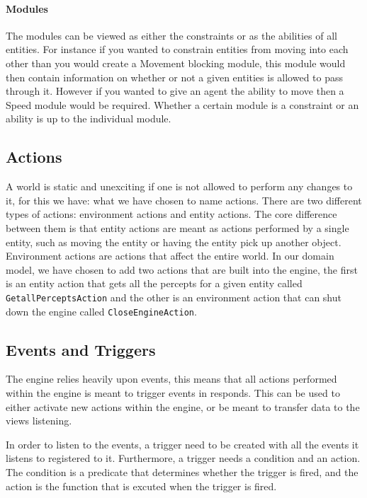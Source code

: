 \paragraph*{Modules}

The modules can be viewed as either the constraints or as the abilities
of all entities. For instance if you wanted to constrain entities
from moving into each other than you would create a Movement blocking
module, this module would then contain information on whether or not
a given entities is allowed to pass through it. However if you wanted
to give an agent the ability to move then a Speed module would be
required. Whether a certain module is a constraint or an ability is
up to the individual module.


\subsection{Actions}

A world is static and unexciting if one is not allowed to perform
any changes to it, for this we have: what we have chosen to name actions.
There are two different types of actions: environment actions and
entity actions. The core difference between them is that entity actions
are meant as actions performed by a single entity, such as moving
the entity or having the entity pick up another object. Environment
actions are actions that affect the entire world. In our domain model,
we have chosen to add two actions that are built into the engine,
the first is an entity action that gets all the percepts for a given
entity called \texttt{GetallPerceptsAction} and the other is an environment
action that can shut down the engine called \texttt{CloseEngineAction}. 


\subsection{Events and Triggers}

The engine relies heavily upon events, this means that all actions
performed within the engine is meant to trigger events in responds.
This can be used to either activate new actions within the engine,
or be meant to transfer data to the views listening. 

In order to listen to the events, a trigger need to be created with
all the events it listens to registered to it. Furthermore, a trigger
needs a condition and an action. The condition is a predicate that
determines whether the trigger is fired, and the action is the function
that is excuted when the trigger is fired.
